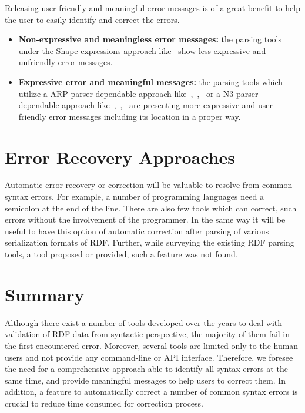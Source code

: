 Releasing user-friendly and meaningful error messages is of a great benefit to help the user to easily identify and correct the errors. 
\begin{itemize}
    \item \textbf{Non-expressive and meaningless error messages:} the parsing tools under the Shape expressions approach like~\cite{prud2014shape} show less expressive and unfriendly error messages.
    \item \textbf{Expressive error and meaningful messages:} the parsing tools which utilize a ARP-parser-dependable approach like~\cite{N3Parser:Online},~\cite{Mybluemix:Validation:Online},~\cite{McBride:2002:JSW:613357.613755} or a N3-parser-dependable approach like~\cite{N3Parser:Online},~\cite{IDLab:Validation:Online},~\cite{petersenturtleeditor} are presenting more expressive and user-friendly error messages including its location in a proper way. 
    
\end{itemize}

\section{Error Recovery Approaches}
Automatic error recovery or correction will be valuable to resolve from common syntax errors. 
For example, a number of programming languages need a semicolon at the end of the line. 
There are also few tools which can correct, such errors without the involvement of the programmer. 
In the same way it will be useful to have this option of automatic correction after parsing of various serialization formats of RDF. 
Further, while surveying the existing RDF parsing tools, a tool proposed or provided, such a feature was not found.  

\section{Summary}

Although there exist a number of tools developed over the years to deal with validation of RDF data from syntactic perspective, the majority of them fail in the first encountered error.
Moreover, several tools are limited only to the human users and not provide any command-line or API interface.
Therefore, we foresee the need for a comprehensive approach able to identify all syntax errors at the same time, and provide meaningful messages to help users to correct them.
In addition, a feature to automatically correct a number of common syntax errors is crucial to reduce time consumed for correction process.  


